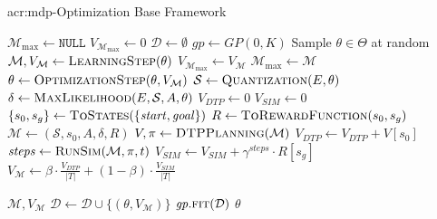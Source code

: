 \begin{algorithm}[t!]
	\caption{\acrshort{acr:mdp}-Optimization Base Framework}
	\label{alg:base-framework}
	\begin{algorithmic}[1]
		\State $\mathcal{M}_\text{max} \gets \texttt{NULL}$
		\State $V_{\mathcal{M}_\text{max}} \gets 0$
		\State $\mathcal{D} \gets \emptyset$ 
		\State $\mathit{gp} \gets GP(0, K)$ 
		\State Sample $\theta \in \Theta$ at random
		\Repeat
			\State $\mathcal{M}, V_\mathcal{M} \gets \textproc{LearningStep}(\theta)$
				\State $V_{\mathcal{M}_\text{max}} \gets V_\mathcal{M}$
				\State $\mathcal{M}_\text{max} \gets \mathcal{M}$
			\EndIf
			\State $\theta \gets \textproc{OptimizationStep}(\theta, V_\mathcal{M})$
		\State\Return 
		\Statex
			\label{alg:line:learn}
			\State $\mathcal{S} \gets \textproc{Quantization}(E, \theta)$
			\State $\delta \gets \textproc{MaxLikelihood}(E, \mathcal{S}, A, \theta)$
			\State $V_\mathit{DTP} \gets 0$
			\State $V_\mathit{SIM} \gets 0$
			\State $\{s_0, s_g\} \gets \textproc{ToStates}(\{\mathit{start}, \mathit{goal}\})$
			\State $R \gets \textproc{ToRewardFunction}(s_0, s_g)$
			\State $\mathcal{M} \gets (\mathcal{S}, s_0, A, \delta, R)$
			\State $V, \pi \gets \textproc{DTPPlanning}(\mathcal{M})$
			\State $V_\mathit{DTP} \gets V_\mathit{DTP} + V[s_0]$
				\State $\mathit{steps} \gets \textproc{RunSim}(\mathcal{M}, \pi, t)$
				\State $V_\mathit{SIM} \gets V_\mathit{SIM} + \gamma^\mathit{steps} \cdot R[s_g]$
			\EndIf
			\EndFor
			\State $V_\mathcal{M} \gets \beta \cdot \frac{V_\mathit{DTP}}{|T|} + (1 - \beta) \cdot \frac{V_\mathit{SIM}}{|T|}$
			
			\State\Return $\mathcal{M}, V_\mathcal{M}$
		\EndFunction
		\Statex
			\State $\mathcal{D} \gets \mathcal{D} \cup \{(\theta, V_\mathcal{M})\}$
			\State $\mathit{gp}.\textproc{fit}(\mathcal{D})$	
				
			\State\Return $\theta$
		\EndFunction
	\end{algorithmic}
\end{algorithm}

